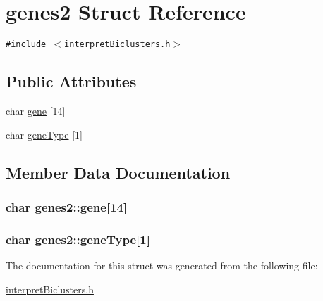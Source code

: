 \hypertarget{structgenes2}{
\section{genes2 Struct Reference}
\label{structgenes2}
}
{\tt \#include $<$interpretBiclusters.h$>$}

\subsection*{Public Attributes}
\begin{CompactItemize}
\item 
char \hyperlink{structgenes2_92532e41ce7143bbe7a5ba6bbe18da94}{gene} \mbox{[}14\mbox{]}
\item 
char \hyperlink{structgenes2_bbdf7c2549d756371d245e659ae59a48}{geneType} \mbox{[}1\mbox{]}
\end{CompactItemize}


\subsection{Member Data Documentation}
\hypertarget{structgenes2_92532e41ce7143bbe7a5ba6bbe18da94}{
\subsubsection[{gene}]{\setlength{\rightskip}{0pt plus 5cm}char {\bf genes2::gene}\mbox{[}14\mbox{]}}}
\label{structgenes2_92532e41ce7143bbe7a5ba6bbe18da94}


\hypertarget{structgenes2_bbdf7c2549d756371d245e659ae59a48}{
\subsubsection[{geneType}]{\setlength{\rightskip}{0pt plus 5cm}char {\bf genes2::geneType}\mbox{[}1\mbox{]}}}
\label{structgenes2_bbdf7c2549d756371d245e659ae59a48}




The documentation for this struct was generated from the following file:\begin{CompactItemize}
\item 
\hyperlink{interpretBiclusters_8h}{interpretBiclusters.h}\end{CompactItemize}
